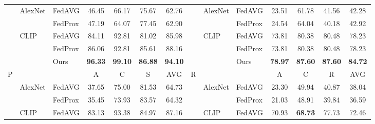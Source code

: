 \begin{table}[t!]
{\begin{tabular}{cllcccc|cllcccc}
                             & \multirow{2}{*}{AlexNet}     & FedAVG  & 46.45          & 66.17          & 75.67          & 62.76          &                            & \multirow{2}{*}{AlexNet}     & FedAVG  & 23.51          & 61.78          & 41.56          & 42.28          \\
                             &                              & FedProx & 47.19          & 64.07          & 77.45          & 62.90          &                            &                              & FedProx & 24.54          & 64.04          & 40.18          & 42.92          \\
                             & \multirow{3}{*}{CLIP}        & FedAVG  & 84.11          & 92.81          & 81.02          & 85.98          &                            & \multirow{3}{*}{CLIP}        & FedAVG  & 73.81          & 80.38          & 80.48          & 78.23          \\
                             &                              & FedProx & 86.06          & 92.81          & 85.61          & 88.16          &                            &                              & FedProx & 73.81          & 80.38          & 80.48          & 78.23          \\
                             &                              & Ours    & \textbf{96.33} & \textbf{99.10} & \textbf{86.88} & \textbf{94.10} &                            &                              & Ours    & \textbf{78.97} & \textbf{87.60} & \textbf{87.60} & \textbf{84.72} \\ \midrule
\multirow{6}{*}{P}           & \multicolumn{1}{l}{}         &         & A              & C              & S              & AVG            & \multirow{6}{*}{R}         & \multicolumn{1}{l}{}         &         & A              & C              & R              & AVG            \\
                             & \multirow{2}{*}{AlexNet}     & FedAVG  & 37.65          & 75.00          & 81.53          & 64.73          &                            & \multirow{2}{*}{AlexNet}     & FedAVG  & 23.30          & 49.94          & 40.87          & 38.04          \\
                             &                              & FedProx & 35.45          & 73.93          & 83.57          & 64.32          &                            &                              & FedProx & 21.03          & 48.91          & 39.84          & 36.59          \\
                             & \multirow{3}{*}{CLIP}        & FedAVG  & 83.13          & 93.38          & 84.97          & 87.16          &                            & \multirow{3}{*}{CLIP}        & FedAVG  & 70.93          & \textbf{68.73} & 77.73          & 72.46          \\

\end{tabular}}
\end{table}
